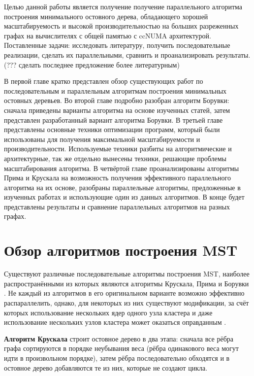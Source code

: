 \documentclass[a4paper,12pt]{extarticle}
\let\stdsection\section
\renewcommand\section{
    \newpage
    \stdsection
}
\begin{document}

Целью данной работы является получение получение параллельного алгоритма построения минимального остовного дерева, обладающего хорошей масштабируемость и высокой производительностью на больших разреженных графах на вычислителях с общей памятью с ccNUMA архитектурой.
Поставленные задачи: исследовать литературу, получить последовательные реализации, сделать их параллельными, сравнить и проанализировать результаты. (??? сделать последнее предложение более литературным)

В первой главе кратко представлен обзор существующих работ по последовательным и параллельным алгоритмам построения минимальных остовных деревьев.
Во второй главе подробно разобран алгоритм Борувки: сначала приведены варианты алгоритма на основе изученных статей, затем представлен разработанный вариант алгоритма Борувки.
В третьей главе представлены основные техники оптимизации программ, который были использованы для получения максимальной масштабируемости и производительности.
Используемые техники разбиты на алгоритмические и архитектурные, так же отдельно вынесены техники, решающие проблемы масштабирования алгоритма.
В четвёртой главе проанализированы алгоритмы Прима и Крускала на возможность получения эффективного параллельного алгоритма на их основе, разобраны параллельные алгоритмы, предложенные в изученных работах и использующие один из данных алгоритмов.
В конце будет представлены результаты и сравнение параллельных алгоритмов на разных графах.



\section{Обзор алгоритмов построения MST}
\label{sec:reviewSeq}

Существуют различные последовательные алгоритмы построения MST, наиболее распространёнными из которых являются алгоритмы Крускала, Прима и Борувки \cite{cormen}.
Не каждый из алгоритмов в его оригинальном варианте возможно эффективно распараллелить, однако, для некоторых из них существуют модификации, за счёт которых использование нескольких ядер одного узла кластера и даже использование нескольких узлов кластера может оказаться оправданным \cite{boruvka-prima,kruskal-parallel}.

\textbf{Алгоритм Крускала} строит остовное дерево в два этапа: сначала все рёбра графа сортируются в порядке неубывания веса (рёбра одинакового веса могут идти в произвольном порядке), затем рёбра последовательно обходятся и в остовное дерево добавляются те из них, которые не создают цикла.
\end{document}
